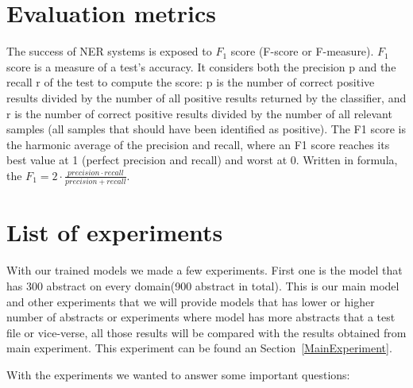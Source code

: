 \documentclass[thesis=M,english]{FITthesis}[2018/05/30]
\begin{document}
\section{Evaluation metrics}
	The success of NER systems is exposed to $F_{1}$ score (F-score or F-measure). $F_{1}$ \cite{wiki:F1} score  is a measure of a test's accuracy. It considers both the precision p  and the recall r of the test to compute the score: p is the number of correct positive results divided by the number of all positive results returned by the classifier, and r is the number of correct positive results divided by the number of all relevant samples (all samples that should have been identified as positive). The F1 score is the harmonic average of the precision and recall, where an F1 score reaches its best value at 1 (perfect precision and recall) and worst at 0. 
Written in formula, the $F_{1} =2\cdot \frac{precision \cdot recall}{precision + recall}$.


\section{List of experiments}
	With our trained models we made a few experiments. First one is the model that has 300 abstract on every domain(900 abstract in total). This is our main model and other experiments that we will provide models that has lower or higher number of abstracts or experiments where model has more abstracts that a test file or vice-verse, all those results will be compared with the results obtained from main experiment. This experiment can be found an Section~\ref{MainExperiment}.
	
	With the experiments we wanted to answer some important questions:
	
\end{document}
